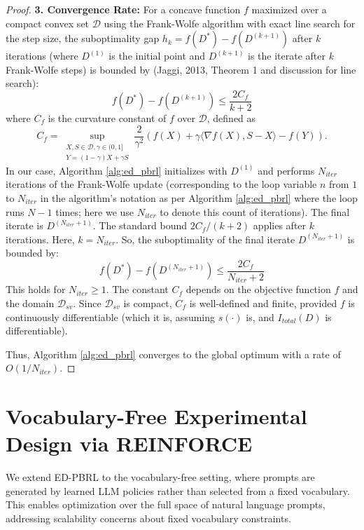 \documentclass{article}
\begin{document}
\begin{proof}
\textbf{3. Convergence Rate:}
For a concave function $f$ maximized over a compact convex set $\mathcal{D}$ using the Frank-Wolfe algorithm with exact line search for the step size, the suboptimality gap $h_k = f(D^*) - f(D^{(k+1)})$ after $k$ iterations (where $D^{(1)}$ is the initial point and $D^{(k+1)}$ is the iterate after $k$ Frank-Wolfe steps) is bounded by (Jaggi, 2013, Theorem 1 \cite{pmlr-v28-jaggi13} and discussion for line search):
\[ f(D^*) - f(D^{(k+1)}) \le \frac{2 C_f}{k+2} \]
where $C_f$ is the curvature constant of $f$ over $\mathcal{D}$, defined as
\[ C_f = \sup_{\substack{X,S \in \mathcal{D}, \gamma \in (0,1] \\ Y=(1-\gamma)X+\gamma S}} \frac{2}{\gamma^2} (f(X) + \gamma \langle \nabla f(X), S-X \rangle - f(Y)). \]
In our case, Algorithm \ref{alg:ed_pbrl} initializes with $D^{(1)}$ and performs $N_{iter}$ iterations of the Frank-Wolfe update (corresponding to the loop variable $n$ from $1$ to $N_{iter}$ in the algorithm's notation as per Algorithm \ref{alg:ed_pbrl} where the loop runs $N-1$ times; here we use $N_{iter}$ to denote this count of iterations). The final iterate is $D^{(N_{iter}+1)}$.
The standard bound $2C_f / (k+2)$ applies after $k$ iterations. Here, $k = N_{iter}$.
So, the suboptimality of the final iterate $D^{(N_{iter}+1)}$ is bounded by:
\[ f(D^*) - f(D^{(N_{iter}+1)}) \le \frac{2 C_f}{N_{iter}+2} \]
This holds for $N_{iter} \ge 1$.
The constant $C_f$ depends on the objective function $f$ and the domain $\mathcal{D}_{sv}$. Since $\mathcal{D}_{sv}$ is compact, $C_f$ is well-defined and finite, provided $f$ is continuously differentiable (which it is, assuming $s(\cdot)$ is, and $I_{total}(D)$ is differentiable).

Thus, Algorithm \ref{alg:ed_pbrl} converges to the global optimum with a rate of $O(1/N_{iter})$.
\end{proof}

\section{Vocabulary-Free Experimental Design via REINFORCE}
\label{sec:reinforce}

We extend ED-PBRL to the vocabulary-free setting, where prompts are generated by learned LLM policies rather than selected from a fixed vocabulary. This enables optimization over the full space of natural language prompts, addressing scalability concerns about fixed vocabulary constraints.
\end{document}
